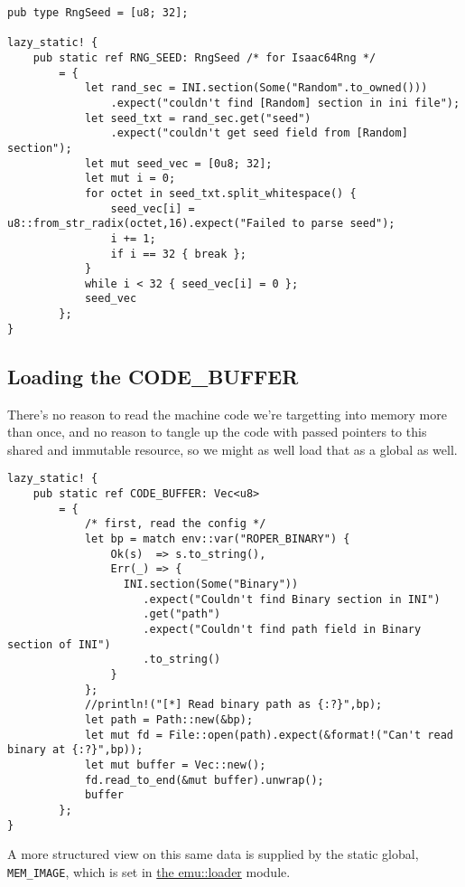 \documentclass[11pt]{article}
\begin{document}
\lstset{language=rust,label=org312c02e,caption= ,captionpos=b,numbers=none}
\begin{lstlisting}
pub type RngSeed = [u8; 32];

lazy_static! {
    pub static ref RNG_SEED: RngSeed /* for Isaac64Rng */
        = {
            let rand_sec = INI.section(Some("Random".to_owned()))
                .expect("couldn't find [Random] section in ini file");
            let seed_txt = rand_sec.get("seed")
                .expect("couldn't get seed field from [Random] section");
            let mut seed_vec = [0u8; 32];
            let mut i = 0;
            for octet in seed_txt.split_whitespace() {
                seed_vec[i] = u8::from_str_radix(octet,16).expect("Failed to parse seed");
                i += 1;
                if i == 32 { break };
            }
            while i < 32 { seed_vec[i] = 0 };
            seed_vec
        };
}
\end{lstlisting}

\subsection{Loading the CODE\_BUFFER}
\label{sec:orgf994489}

There's no reason to read the machine code we're targetting into memory
more than once, and no reason to tangle up the code with passed pointers
to this shared and immutable resource, so we might as well load that as
a global as well.
\lstset{language=rust,label=org2b8ce20,caption= ,captionpos=b,numbers=none}
\begin{lstlisting}
lazy_static! {
    pub static ref CODE_BUFFER: Vec<u8>
        = {
            /* first, read the config */
            let bp = match env::var("ROPER_BINARY") {
                Ok(s)  => s.to_string(),
                Err(_) => {
                  INI.section(Some("Binary"))
                     .expect("Couldn't find Binary section in INI")
                     .get("path")
                     .expect("Couldn't find path field in Binary section of INI")
                     .to_string()
                }
            };
            //println!("[*] Read binary path as {:?}",bp);
            let path = Path::new(&bp);
            let mut fd = File::open(path).expect(&format!("Can't read binary at {:?}",bp));
            let mut buffer = Vec::new();
            fd.read_to_end(&mut buffer).unwrap();
            buffer
        };
}
\end{lstlisting}

A more structured view on this same data is supplied by the static global,
\texttt{MEM\_IMAGE}, which is set in \href{../emu/loader.pdf}{the emu::loader} module.
\end{document}
